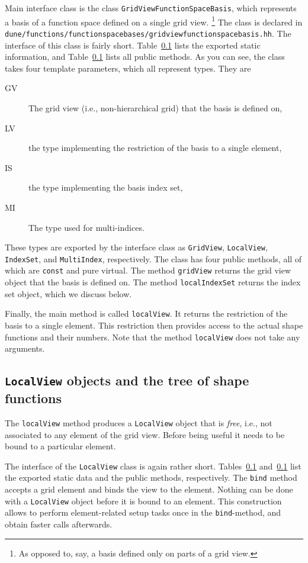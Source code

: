 \documentclass[a4paper,10pt,headings=normal,bibliography=totoc]{scrartcl}
\newcommand{\cpp}[1]{\lstinline[basicstyle=\ttfamily]!#1!}
\newcommand{\file}[1]{\texttt{#1}}
\begin{document}
Main interface class is the class \cpp{GridViewFunctionSpaceBasis}, which represents a basis of a
function space defined on a single grid view.%
\footnote{As opposed to, say, a basis defined only on parts of a grid view.}
The class is declared in
\file{dune/functions/functionspacebases/gridviewfunctionspacebasis.hh}.  The interface of this class
is fairly short.  Table~\ref{} lists the exported static information,
and Table~\ref{} lists all public methods.
As you can see, the class takes four template parameters, which all represent types.  They are
\begin{description}
 \item [GV] The grid view (i.e., non-hierarchical grid) that the basis is defined on,
 \item [LV] the type implementing the restriction of the basis to a single element,
 \item [IS] the type implementing the basis index set,
 \item [MI] The type used for multi-indices.
\end{description}
These types are exported by the interface class as \cpp{GridView}, \cpp{LocalView}, \cpp{IndexSet}, and
\cpp{MultiIndex}, respectively.  The class has four public methods, all of which are \cpp{const}
and pure virtual.  The method \cpp{gridView} returns the grid view object that the basis is
defined on.  The method \cpp{localIndexSet} returns the index set object, which we discuss below.

Finally, the main method is called \cpp{localView}.  It returns the restriction of the basis
to a single element.  This restriction then provides access to the actual shape functions and
their numbers.  Note that the method \cpp{localView} does not take any arguments.

\subsection{\texorpdfstring{\cpp{LocalView}}{LocalView} objects and the tree of shape functions}

The \cpp{localView}
method produces a \cpp{LocalView} object that is {\em free}, i.e., not associated to any
element of the grid view.  Before being useful it needs to be bound to a particular element.

The interface of the \cpp{LocalView} class is again rather short.  Tables~\ref{}
and~\ref{} list the exported static data and the public methods, respectively.
The \cpp{bind} method accepts a grid element and binds the view to the element.  Nothing can be done with a
\cpp{LocalView} object before it is bound to an element.  This construction allows to perform element-related
setup tasks once in the \cpp{bind}-method, and obtain faster calls afterwards.
\end{document}
